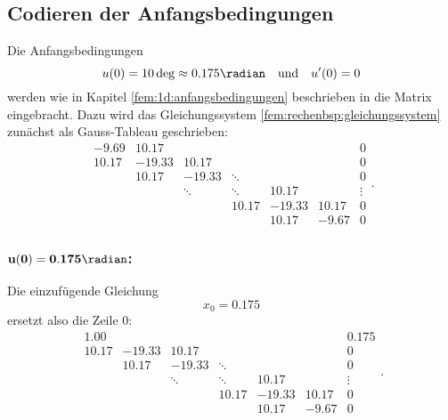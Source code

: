 \subsection{Codieren der Anfangsbedingungen}
Die Anfangsbedingungen
\begin{equation}
    u(0) = 10 \deg \approx 0.175 \radian
    \quad \text{und} \quad
    u'(0) = 0
\end{equation}
werden wie in Kapitel \ref{fem:1d:anfangsbedingungen} beschrieben in die Matrix eingebracht.
Dazu wird das Gleichungssystem \ref{fem:rechenbsp:gleichungssystem} zunächst als Gauss-Tableau geschrieben:
\begin{equation}
    \boxed{\begin{matrix}
        -9.69  & 10.17  &        &        &        &        & 0 \\
        10.17  &-19.33  & 10.17  &        &        &        & 0 \\
               & 10.17  &-19.33  & \ddots &        &        & 0 \\
               &        & \ddots & \ddots & 10.17  &        & \vdots \\
               &        &        & 10.17  &-19.33  & 10.17  & 0 \\
               &        &        &        & 10.17  & -9.67  & 0 
    \end{matrix}}.
\end{equation}

\subsubsection{$\mathbf{u(0) = 0.175 \radian}$:}
Die einzufügende Gleichung
\begin{equation}
    x_0 = 0.175
\end{equation}
ersetzt also die Zeile $0$:
\begin{equation}
    \boxed{\begin{matrix}
         1.00  &        &        &        &        &        & 0.175 \\
        10.17  &-19.33  & 10.17  &        &        &        & 0 \\
               & 10.17  &-19.33  & \ddots &        &        & 0 \\
               &        & \ddots & \ddots & 10.17  &        & \vdots \\
               &        &        & 10.17  &-19.33  & 10.17  & 0 \\
               &        &        &        & 10.17  & -9.67  & 0 
    \end{matrix}}.
\end{equation}


